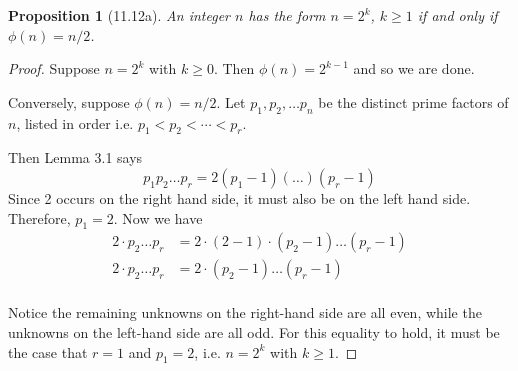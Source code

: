 \documentclass[letterpaper, 12pt, oneside]{memoir}
\theoremstyle{mystyle}
\newtheorem{prop}[thm]{Proposition}
\begin{document}
\begin{prop}[11.12a]
    An integer $n$ has the form $n=2^k$, $k \geq 1$ if and only if 
    $\phi(n) = n/2$.
\end{prop}
\begin{proof}
    Suppose $n=2^k$ with $k \geq 0$. Then $\phi(n) = 2^{k-1}$ and so we are
    done.
    
    Conversely, suppose $\phi(n)=n/2$. Let $p_1, p_2, \dots p_n$ be the distinct
    prime factors of $n$, listed in order i.e. $p_1 < p_2 < \cdots < p_r$.
    
    Then Lemma 3.1 says
    \[ p_1 p_2 \ldots p_r = 2 (p_1 - 1)(\ldots)(p_r - 1) \]
    Since 2 occurs on the right hand side, it must also be on the left hand
    side. Therefore, $p_1 = 2$. Now we have
    \begin{align*}
    2 \cdot p_2 \dots p_r &= 2 \cdot (2 - 1) \cdot (p_2 - 1) \dots (p_r - 1) \\
    2 \cdot p_2 \dots p_r &= 2 \cdot (p_2 - 1) \dots (p_r - 1) \\
    \end{align*}
    
    Notice the remaining unknowns on the right-hand side are all even, while
    the unknowns on the left-hand side are all odd. For this equality to hold,
    it must be the case that $r=1$ and $p_1 = 2$, i.e. $n=2^k$ with $k \geq 1$.
\end{proof}
\end{document}
